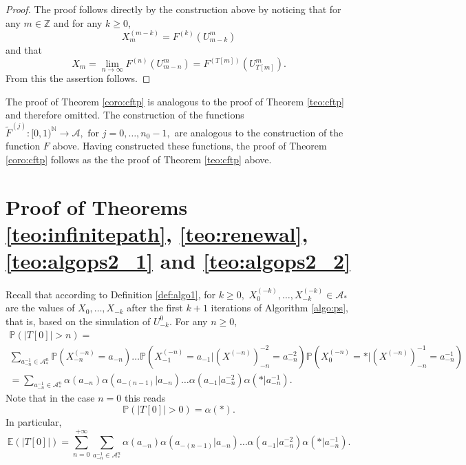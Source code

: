 \documentclass[a4paper]{article}
\def\P{{\mathbb P}}
\newcommand{\E}{\mathbb{E}}
\newcommand{\Z}{\mathbb{Z}}
\newcommand{\N}{\mathbb{N}}
\newcommand{\A}{\mathcal{A}}
\begin{document}
\begin{proof}
The proof follows directly by the construction above by noticing that
for any $m\in \Z$ and for any $k\geq 0$,
\begin{equation*} %
X_{m}^{(m-k)}= F^{(k)}(U^m_{m-k})
\end{equation*}
and that 
$$ X_m = \lim_{n\to\infty}F^{(n)} ( U^m_{m-n})=F^{(T[m])} ( U^m_{T[m]} ).$$ 
From this the assertion follows. 
\end{proof}

The proof of Theorem \ref{coro:cftp} is analogous to the proof of Theorem \ref{teo:cftp} and therefore omitted. The construction of the functions $\tilde{F}^{(j)}: [0,1)^{\N} \to \A, \text{ for } j=0,\ldots, n_0-1,$ are analogous to the construction of the function $F$ above. Having constructed these functions, the proof of Theorem \ref{coro:cftp} follows as the the proof of Theorem \ref{teo:cftp} above.







\section{Proof of Theorems \ref{teo:infinitepath}, \ref{teo:renewal}, \ref{teo:algops2_1} and \ref{teo:algops2_2}} \label{sec:proofsalgo1}


Recall that according to Definition \ref{def:algo1}, for $k\geq 0,$ $X_0^{(-k)},\ldots,X_{-k }^{(-k)} 
\in \A_*$ are the values of $X_0,\ldots,X_{-k}$ after the first $k+1$ iterations of Algorithm \ref{algo:ps}, that is, based on the simulation of $ U_{-k }^0.$  For any $n \geq 0$,
\begin{multline} \label{eq:probt0geqn}
\P(|T[0]|>n)= 
\\
\sum_{a_{-n}^{-1}\in \A_*^n}\P(X_{-n}^{(-n)}=a_{-n})%
\ldots \P(X_{-1}^{(-n)}=a_{-1}|(X^{(-n)})_{-n}^{-2}=a_{-n}^{-2})\P(X_{0}^{(-n)}=* |(X^{(-n)})_{-n}^{-1}=a_{-n}^{-1})
\\
=\sum_{a_{-n}^{-1}\in \A_*^n}\alpha(a_{-n})\alpha(a_{-(n-1)}|a_{-n})\ldots \alpha(a_{-1}|a_{-n}^{-2})\alpha(*|a_{-n}^{-1}).
\end{multline}
Note that in the case $n=0$ this reads
$$
\P(|T[0]|>0)=\alpha(*).
$$
In particular, 
$$
\E(|T[0]|)=\sum_{n=0}^{+\infty}\sum_{a_{-n}^{-1}\in \A_*^n}\alpha(a_{-n})\alpha(a_{-(n-1)}|a_{-n})\ldots \alpha(a_{-1}|a_{-n}^{-2})\alpha(*|a_{-n}^{-1}).
$$
\end{document}
